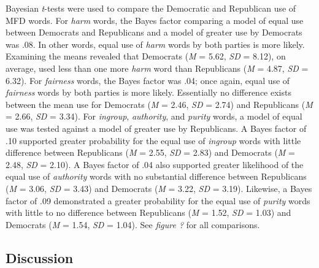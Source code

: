 \documentclass[english,man]{apa6}
\theoremstyle{definition}
\theoremstyle{definition}
\theoremstyle{definition}
\theoremstyle{remark}
\begin{document}
Bayesian \emph{t}-tests were used to compare the Democratic and
Republican use of MFD words. For \emph{harm} words, the Bayes factor
comparing a model of equal use between Democrats and Republicans and a
model of greater use by Democrats was .08. In other words, equal use of
\emph{harm} words by both parties is more likely. Examining the means
revealed that Democrats (\emph{M} = 5.62, \emph{SD} = 8.12), on average,
used less than one more \emph{harm} word than Republicans (\emph{M} =
4.87, \emph{SD} = 6.32). For \emph{fairness} words, the Bayes factor was
.04; once again, equal use of \emph{fairness} words by both parties is
more likely. Essentially no difference exists between the mean use for
Democrats (\emph{M} = 2.46, \emph{SD} = 2.74) and Republicans (\emph{M}
= 2.66, \emph{SD} = 3.34). For \emph{ingroup}, \emph{authority}, and
\emph{purity} words, a model of equal use was tested against a model of
greater use by Republicans. A Bayes factor of .10 supported greater
probability for the equal use of \emph{ingroup} words with little
difference between Republicans (\emph{M} = 2.55, \emph{SD} = 2.83) and
Democrats (\emph{M} = 2.48, \emph{SD} = 2.10). A Bayes factor of .04
also supported greater likelihood of the equal use of \emph{authority}
words with no substantial difference between Republicans (\emph{M} =
3.06, \emph{SD} = 3.43) and Democrats (\emph{M} = 3.22, \emph{SD} =
3.19). Likewise, a Bayes factor of .09 demonstrated a greater
probability for the equal use of \emph{purity} words with little to no
difference between Republicans (\emph{M} = 1.52, \emph{SD} = 1.03) and
Democrats (\emph{M} = 1.54, \emph{SD} = 1.04). See \emph{figure ?} for
all comparisons.

\subsection{Discussion}\label{discussion}
\end{document}
